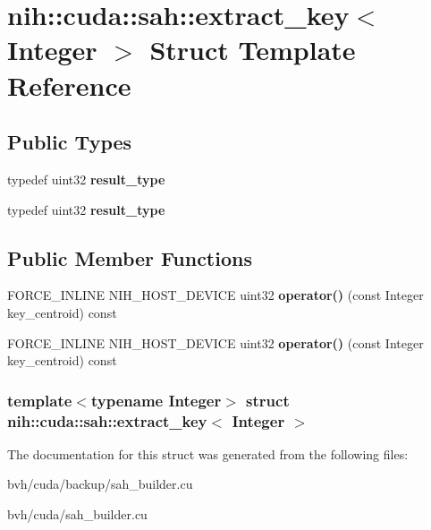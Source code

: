 \hypertarget{structnih_1_1cuda_1_1sah_1_1extract__key}{
\section{nih\-:\-:cuda\-:\-:sah\-:\-:extract\-\_\-key$<$ \-Integer $>$ \-Struct \-Template \-Reference}
\label{structnih_1_1cuda_1_1sah_1_1extract__key}
}
\subsection*{\-Public \-Types}
\begin{DoxyCompactItemize}
\item 
\hypertarget{structnih_1_1cuda_1_1sah_1_1extract__key_afb8f74c21d9c8f8f9c665063fb6976bf}{
typedef uint32 {\bfseries result\-\_\-type}}
\label{structnih_1_1cuda_1_1sah_1_1extract__key_afb8f74c21d9c8f8f9c665063fb6976bf}

\item 
\hypertarget{structnih_1_1cuda_1_1sah_1_1extract__key_afb8f74c21d9c8f8f9c665063fb6976bf}{
typedef uint32 {\bfseries result\-\_\-type}}
\label{structnih_1_1cuda_1_1sah_1_1extract__key_afb8f74c21d9c8f8f9c665063fb6976bf}

\end{DoxyCompactItemize}
\subsection*{\-Public \-Member \-Functions}
\begin{DoxyCompactItemize}
\item 
\hypertarget{structnih_1_1cuda_1_1sah_1_1extract__key_a31ba7dacef71c78c8279d09400f6d19e}{
\-F\-O\-R\-C\-E\-\_\-\-I\-N\-L\-I\-N\-E \-N\-I\-H\-\_\-\-H\-O\-S\-T\-\_\-\-D\-E\-V\-I\-C\-E uint32 {\bfseries operator()} (const \-Integer key\-\_\-centroid) const }
\label{structnih_1_1cuda_1_1sah_1_1extract__key_a31ba7dacef71c78c8279d09400f6d19e}

\item 
\hypertarget{structnih_1_1cuda_1_1sah_1_1extract__key_a31ba7dacef71c78c8279d09400f6d19e}{
\-F\-O\-R\-C\-E\-\_\-\-I\-N\-L\-I\-N\-E \-N\-I\-H\-\_\-\-H\-O\-S\-T\-\_\-\-D\-E\-V\-I\-C\-E uint32 {\bfseries operator()} (const \-Integer key\-\_\-centroid) const }
\label{structnih_1_1cuda_1_1sah_1_1extract__key_a31ba7dacef71c78c8279d09400f6d19e}

\end{DoxyCompactItemize}
\subsubsection*{template$<$typename Integer$>$ struct nih\-::cuda\-::sah\-::extract\-\_\-key$<$ Integer $>$}



\-The documentation for this struct was generated from the following files\-:\begin{DoxyCompactItemize}
\item 
bvh/cuda/backup/sah\-\_\-builder.\-cu\item 
bvh/cuda/sah\-\_\-builder.\-cu\end{DoxyCompactItemize}
